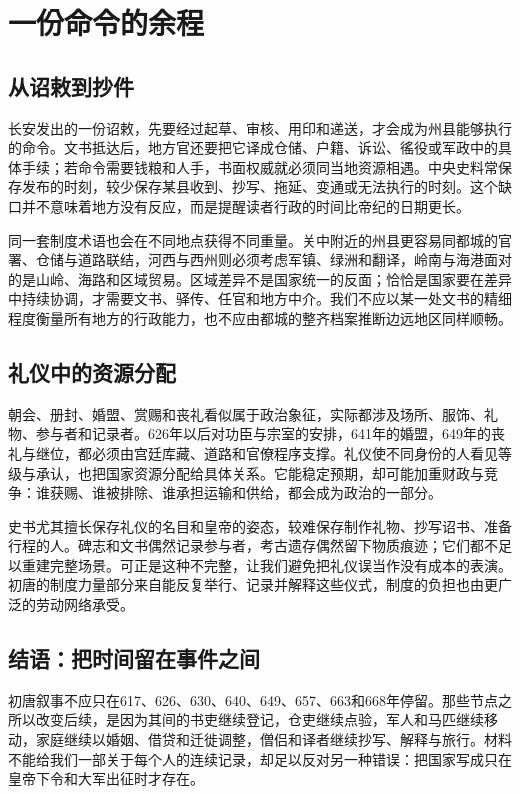 \section{一份命令的余程}
\label{sec:early-tang-acceptance-scenes-five}

\subsection{从诏敕到抄件}
长安发出的一份诏敕，先要经过起草、审核、用印和递送，才会成为州县能够执行的命令。文书抵达后，地方官还要把它译成仓储、户籍、诉讼、徭役或军政中的具体手续；若命令需要钱粮和人手，书面权威就必须同当地资源相遇。中央史料常保存发布的时刻，较少保存某县收到、抄写、拖延、变通或无法执行的时刻。这个缺口并不意味着地方没有反应，而是提醒读者行政的时间比帝纪的日期更长。

同一套制度术语也会在不同地点获得不同重量。关中附近的州县更容易同都城的官署、仓储与道路联结，河西与西州则必须考虑军镇、绿洲和翻译，岭南与海港面对的是山岭、海路和区域贸易。区域差异不是国家统一的反面；恰恰是国家要在差异中持续协调，才需要文书、驿传、任官和地方中介。我们不应以某一处文书的精细程度衡量所有地方的行政能力，也不应由都城的整齐档案推断边远地区同样顺畅。

\subsection{礼仪中的资源分配}
朝会、册封、婚盟、赏赐和丧礼看似属于政治象征，实际都涉及场所、服饰、礼物、参与者和记录者。626年以后对功臣与宗室的安排，641年的婚盟，649年的丧礼与继位，都必须由宫廷库藏、道路和官僚程序支撑。礼仪使不同身份的人看见等级与承认，也把国家资源分配给具体关系。它能稳定预期，却可能加重财政与竞争：谁获赐、谁被排除、谁承担运输和供给，都会成为政治的一部分。

史书尤其擅长保存礼仪的名目和皇帝的姿态，较难保存制作礼物、抄写诏书、准备行程的人。碑志和文书偶然记录参与者，考古遗存偶然留下物质痕迹；它们都不足以重建完整场景。可正是这种不完整，让我们避免把礼仪误当作没有成本的表演。初唐的制度力量部分来自能反复举行、记录并解释这些仪式，制度的负担也由更广泛的劳动网络承受。

\subsection{结语：把时间留在事件之间}
初唐叙事不应只在617、626、630、640、649、657、663和668年停留。那些节点之所以改变后续，是因为其间的书吏继续登记，仓吏继续点验，军人和马匹继续移动，家庭继续以婚姻、借贷和迁徙调整，僧侣和译者继续抄写、解释与旅行。材料不能给我们一部关于每个人的连续记录，却足以反对另一种错误：把国家写成只在皇帝下令和大军出征时才存在。

